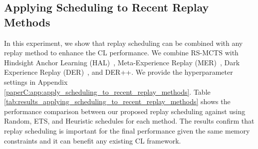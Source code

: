 
\subsection{Applying Scheduling to Recent Replay Methods}\label{paperC:sec:applying_scheduling_to_recent_replay_methods}

In this experiment, we show that replay scheduling can be combined with any replay method to enhance the CL performance. We combine RS-MCTS with Hindsight Anchor Learning (HAL)~, Meta-Experience Replay (MER)~, Dark Experience Replay (DER)~, and DER++. We provide the hyperparameter settings in Appendix \ref{paperC:app:apply_scheduling_to_recent_replay_methods}. Table \ref{tab:results_applying_scheduling_to_recent_replay_methods} shows the performance comparison between our proposed replay scheduling against using Random, ETS, and Heuristic schedules for each method. The results confirm that replay scheduling %
is important for the final performance given the same memory constraints and it can benefit any existing CL framework. 


